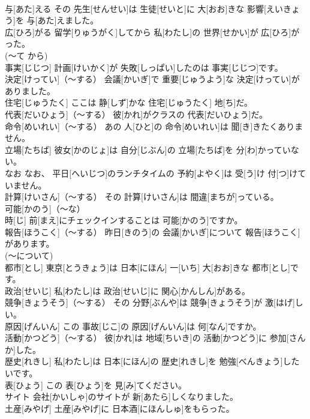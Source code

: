 \documentclass[8pt]{extreport}
\begin{document}
\begin{CJK}{UTF8}{min}
\\	与[あた]える	その 先生[せんせい]は 生徒[せいと]に 大[おお]きな 影響[えいきょう]を 与[あた]えました。		
\\	広[ひろ]がる	留学[りゅうがく]してから 私[わたし]の 世界[せかい]が 広[ひろ]がった。		
\\	(～て から) 
\\	事実[じじつ]	計画[けいかく]が 失敗[しっぱい]したのは 事実[じじつ]です。		
\\	決定[けってい]（～する）	会議[かいぎ]で 重要[じゅうよう]な 決定[けってい]がありました。		
\\	住宅[じゅうたく]	ここは 静[しず]かな 住宅[じゅうたく] 地[ち]だ。		
\\	代表[だいひょう]（～する）	彼[かれ]がクラスの 代表[だいひょう]だ。		
\\	命令[めいれい]（～する）	あの 人[ひと]の 命令[めいれい]は 聞[き]きたくありません。		
\\	立場[たちば]	彼女[かのじょ]は 自分[じぶん]の 立場[たちば]を 分[わ]かっていない。		
\\	なお	なお、 平日[へいじつ]のランチタイムの 予約[よやく]は 受[う]け 付[つ]けていません。		
\\	計算[けいさん]（～する）	その 計算[けいさん]は 間違[まちが]っている。		
\\	可能[かのう]（～な）	
\\	時[じ] 前[まえ]にチェックインすることは 可能[かのう]ですか。		
\\	報告[ほうこく]（～する）	昨日[きのう]の 会議[かいぎ]について 報告[ほうこく]があります。		
\\	(～について) 
\\	都市[とし]	東京[とうきょう]は 日本[にほん] 一[いち] 大[おお]きな 都市[とし]です。		
\\	政治[せいじ]	私[わたし]は 政治[せいじ]に 関心[かんしん]がある。		
\\	競争[きょうそう]（～する）	その 分野[ぶんや]は 競争[きょうそう]が 激[はげ]しい。		
\\	原因[げんいん]	この 事故[じこ]の 原因[げんいん]は 何[なん]ですか。		
\\	活動[かつどう]（～する）	彼[かれ]は 地域[ちいき]の 活動[かつどう]に 参加[さんか]した。		
\\	歴史[れきし]	私[わたし]は 日本[にほん]の 歴史[れきし]を 勉強[べんきょう]したいです。		
\\	表[ひょう]	この 表[ひょう]を 見[み]てください。		
\\	サイト	会社[かいしゃ]のサイトが 新[あたら]しくなりました。		
\\	土産[みやげ]	土産[みやげ]に 日本酒[にほんしゅ]をもらった。		

\end{CJK}
\end{document}
